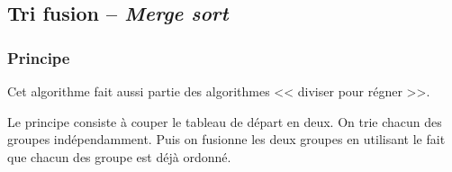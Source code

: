 %
%
\subsection{Tri fusion -- \textit{Merge sort}}

\subsubsection{Principe}


Cet algorithme fait aussi partie des algorithmes << diviser pour régner >>.

Le principe consiste à couper le tableau de départ en deux. On trie chacun des groupes indépendamment. Puis on fusionne les deux groupes en utilisant le fait que chacun des groupe est déjà ordonné.

